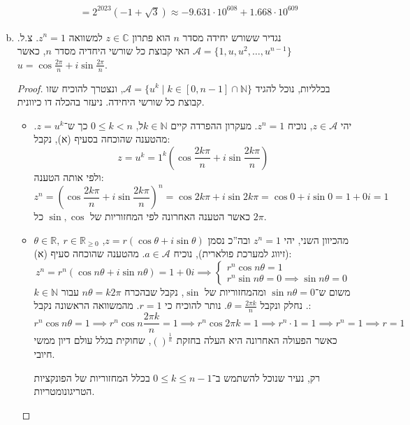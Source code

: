 \documentclass[]{article}
\newcommand\N     {\mathbb{N}}
\newcommand\R     {\mathbb{R}}
\newcommand\C     {\mathbb{C}}
\newcommand\ac    {\mathcal{A}}
\newcommand\ta    {\theta}
\begin{document}
\begin{enumerate}[(a)]
\begin{align}
			&= 2^{2023}(-1 + \sqrt3) \approx -9.631 \cdot 10^{608} + 1.668 \cdot 10^{609}
		\end{align}
		\item נגדיר ששורש יחידה מסדר $n$ הוא פתרון $z \in \C$ למשוואה $z^n = 1$. צ.ל. $\ac = \{1, u, u^2, \dots, u^{n - 1}\}$ האי קבוצת כל שורשי היחדיה מסדר $n$, כאשר $u = \cos \frac{2\pi }{n} + i \sin \frac{2\pi }{n}$. 
		\begin{proof}
			בכלליות, נוכל להגיד $\ac = \{u^{k} \mid k \in [0, n - 1] \cap \N\}$, ונצטרך להוכיח שזו קבוצת כל שורשי היחידה. ניעזר בהכלה דו כיוונית. 
			\begin{itemize}
				\item יהי $z \in \ac$, נוכיח $z^n = 1 $. מעקרון ההפרדה קיים $לk \in \N$, $0 \le k < n$ כך ש־$z = u^{k}$. מהטענה שהוכחה בסעיף (א), נקבל: 
				\[ z = u^k = 1^{k}\left (\cos \frac{2k\pi}{n} + i \sin \frac{2k\pi}{n} \right ) \]
				ולפי אותה הטענה: 
				\[ z^n = \left (\cos \frac{2k\pi}{n} + i \sin \frac{2k\pi}{n} \right )^n = \cos 2k\pi + i \sin 2k\pi = \cos 0 + i \sin 0 = 1 + 0i = 1 \]
				כאשר הטענה האחרונה לפי המחזוריות של $\sin, \cos $ כל $2\pi $. 
				\item מהכיוון השני, יהי $z^n = 1$ ובה''כ נסמן $z = r(\cos \ta + i \sin \ta)$, $\ta \in \R, \ r \in \R_{\ge 0}$ (זיווג למערכת פולארית), נוכיח $a \in \ac$. מהטענה שהוכחה סעיף (א): 
				\[ z^n = r^n(\cos n\ta + i \sin n\ta) = 1 + 0i \implies \begin{cases}
					r^n \cos n \ta = 1 \\
					r^n \sin n \ta = 0 \implies \sin n \ta = 0
				\end{cases} \]
				משום ש־$\sin n \ta = 0 $ ומהמחזוריות של $\sin$, נקבל שבהכרח $n \ta = k2\pi $ עבור $k \in \N $. נחלק ונקבל $\ta = \frac{2\pi k}{n}$. נותר להוכיח כי $r = 1 $. מהמשוואה הראשונה נקבל: 
				\[ r^n \cos n \ta = 1 \implies r^n \cos n \frac{2\pi k}{n} = 1 \implies r^n \cos 2\pi k = 1 \implies r^n \cdot 1 = 1 \implies r^n = 1 \implies r = 1\]
				כאשר הפעולה האחרונה היא העלה בחזקת $()^{\frac{1}{n}}$, שחוקית בגלל עולם דיון ממשי חיובי. 
				
				רק, נעיר שנוכל להשתמש ב־$0 \le k \le n - 1 $ בכלל המחזוריות של הפונקציות הטריגונומטריות. 
			\end{itemize}
			

\end{proof}
\end{enumerate}
\end{document}
